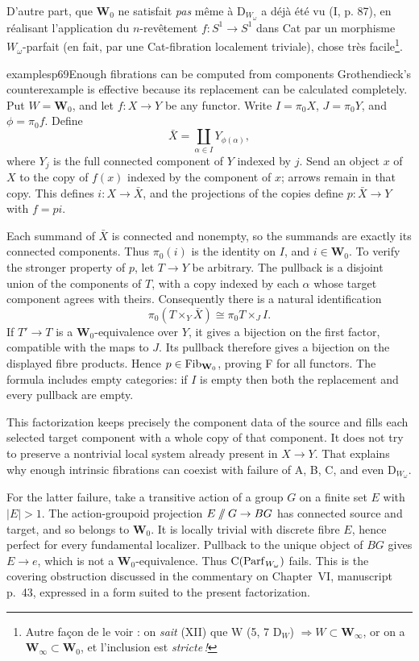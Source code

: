 D'autre part, que $\mathbf{W}_0$ ne satisfait \textit{pas} même à $\mathrm{D}_{W_\omega}$ a déjà été vu (I, p. 87),
en réalisant l'application du $n$-revêtement $f : S^1 \longrightarrow S^1$ dans Cat par un morphisme $W_\omega$-parfait (en fait, par une Cat-fibration localement triviale), chose très facile\footnote[37]{Autre façon de le voir : on \textit{sait} (XII) que $\mathrm{W}$ (5, 7 $\mathrm{D}_W$) $\Longrightarrow W \subset \mathbf{W}_\infty$, or on a $\mathbf{W}_\infty \subset \mathbf{W}_0$, et l'inclusion est \textit{stricte\,!}}.

\begin{dcomment}{examples}{p69}{Enough fibrations can be computed from components}
Grothendieck's counterexample is effective because its replacement can be calculated completely. Put $W=\mathbf W_0$, and let $f:X\to Y$ be any functor. Write $I=\pi_0X$, $J=\pi_0Y$, and $\phi=\pi_0f$. Define
\[
 \bar X=\coprod_{\alpha\in I}Y_{\phi(\alpha)},
\]
where $Y_j$ is the full connected component of $Y$ indexed by $j$. Send an object $x$ of $X$ to the copy of $f(x)$ indexed by the component of $x$; arrows remain in that copy. This defines $i:X\to\bar X$, and the projections of the copies define $p:\bar X\to Y$ with $f=pi$.

Each summand of $\bar X$ is connected and nonempty, so the summands are exactly its connected components. Thus $\pi_0(i)$ is the identity on $I$, and $i\in\mathbf W_0$. To verify the stronger property of $p$, let $T\to Y$ be arbitrary. The pullback is a disjoint union of the components of $T$, with a copy indexed by each $\alpha$ whose target component agrees with theirs. Consequently there is a natural identification
\[
 \pi_0(T\times_Y\bar X)
 \cong \pi_0T\times_J I.
\]
If $T'\to T$ is a $\mathbf W_0$-equivalence over $Y$, it gives a bijection on the first factor, compatible with the maps to $J$. Its pullback therefore gives a bijection on the displayed fibre products. Hence $p\in\mathrm{Fib}_{\mathbf W_0}$, proving F for all functors. The formula includes empty categories: if $I$ is empty then both the replacement and every pullback are empty.

This factorization keeps precisely the component data of the source and fills each selected target component with a whole copy of that component. It does not try to preserve a nontrivial local system already present in $X\to Y$. That explains why enough intrinsic fibrations can coexist with failure of A, B, C, and even $\mathrm D_{W_\omega}$.

For the latter failure, take a transitive action of a group $G$ on a finite set $E$ with $|E|>1$. The action-groupoid projection $E\mathbin{/\mkern-6mu/}G\to BG$ has connected source and target, and so belongs to $\mathbf W_0$. It is locally trivial with discrete fibre $E$, hence perfect for every fundamental localizer. Pullback to the unique object of $BG$ gives $E\to e$, which is not a $\mathbf W_0$-equivalence. Thus $\mathrm C(\mathrm{Parf}_{W_\omega})$ fails. This is the covering obstruction discussed in the commentary on Chapter~VI, manuscript p.~43, expressed in a form suited to the present factorization.
\end{dcomment}


